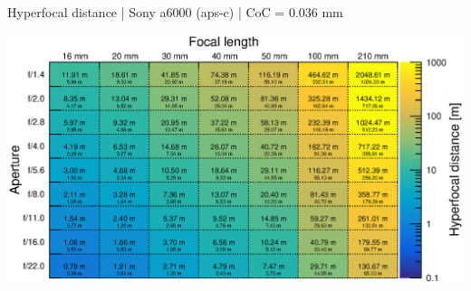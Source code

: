 \documentclass[aspectratio=169]{beamer}
\begin{document}
\begin{frame}[plain]{}
  \vspace{2ex}
  \centering
  Hyperfocal distance | Sony a6000 (aps-c) | CoC = 0.036 mm
  
  \vspace{2ex}
  \includegraphics[width=1.0\textwidth]{img/hyperfocal-distance.eps}
\end{frame}
\end{document}
